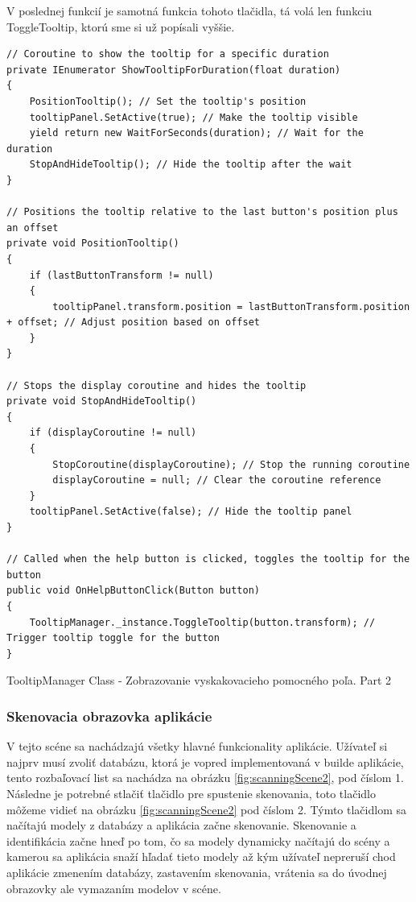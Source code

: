 V poslednej funkcií je samotná funkcia tohoto tlačidla, tá volá len funkciu ToggleTooltip, ktorú sme si už popísali vyššie.

\begin{algorithm}[H]
 \lstset{style=Csharp}
    \begin{lstlisting}
// Coroutine to show the tooltip for a specific duration
private IEnumerator ShowTooltipForDuration(float duration)
{
    PositionTooltip(); // Set the tooltip's position
    tooltipPanel.SetActive(true); // Make the tooltip visible
    yield return new WaitForSeconds(duration); // Wait for the duration
    StopAndHideTooltip(); // Hide the tooltip after the wait
}

// Positions the tooltip relative to the last button's position plus an offset
private void PositionTooltip()
{
    if (lastButtonTransform != null)
    {
        tooltipPanel.transform.position = lastButtonTransform.position + offset; // Adjust position based on offset
    }
}

// Stops the display coroutine and hides the tooltip
private void StopAndHideTooltip()
{
    if (displayCoroutine != null)
    {
        StopCoroutine(displayCoroutine); // Stop the running coroutine
        displayCoroutine = null; // Clear the coroutine reference
    }
    tooltipPanel.SetActive(false); // Hide the tooltip panel
}

// Called when the help button is clicked, toggles the tooltip for the button
public void OnHelpButtonClick(Button button)
{
    TooltipManager._instance.ToggleTooltip(button.transform); // Trigger tooltip toggle for the button
}
    \end{lstlisting}
     \caption{TooltipManager Class - Zobrazovanie vyskakovacieho pomocného poľa. Part 2}
     \label{tooltipManagerPart2}
\end{algorithm}

\subsubsection{Skenovacia obrazovka aplikácie}


V tejto scéne sa nachádzajú všetky hlavné funkcionality aplikácie. Užívateľ si najprv musí zvoliť databázu, ktorá je vopred implementovaná v builde aplikácie, tento rozbaľovací list sa nachádza na obrázku \ref{fig:scanningScene2}, pod číslom 1. Následne je potrebné stlačiť tlačidlo pre spustenie skenovania, toto tlačidlo môžeme vidieť na obrázku \ref{fig:scanningScene2} pod číslom 2. Týmto tlačidlom sa načítajú modely z databázy a aplikácia začne skenovanie. Skenovanie a identifikácia začne hneď po tom, čo sa modely dynamicky načítajú do scény a kamerou sa aplikácia snaží hľadať tieto modely až kým užívateľ nepreruší chod aplikácie zmenením databázy, zastavením skenovania, vrátenia sa do úvodnej obrazovky ale vymazaním modelov v scéne. 

